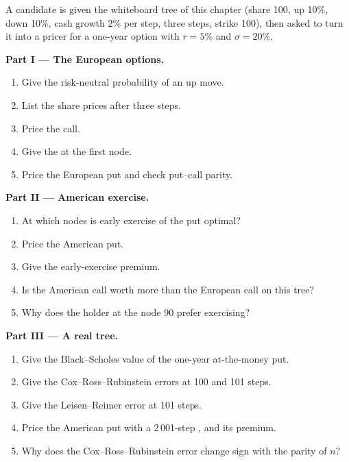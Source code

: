 \begin{problem}\label{pb:dv:the-binomial-model:1}
A candidate is given the whiteboard tree of this chapter (share 100, up 10\%,
down 10\%, cash growth 2\% per step, three steps, strike 100), then asked to turn
it into a pricer for a one-year option with $r=5\%$ and $\sigma=20\%$.

\medskip\noindent\textbf{Part I --- The European options.}
\begin{enumerate}
\item Give the risk-neutral probability of an up move.
\item List the share prices after three steps.
\item Price the call.
\item Give the  at the first node.
\item Price the European put and check put--call parity.
\end{enumerate}

\medskip\noindent\textbf{Part II --- American exercise.}
\begin{enumerate}[resume]
\item At which nodes is early exercise of the put optimal?
\item Price the American put.
\item Give the early-exercise premium.
\item Is the American call worth more than the European call on this tree?
\item Why does the holder at the node 90 prefer exercising?
\end{enumerate}

\medskip\noindent\textbf{Part III --- A real tree.}
\begin{enumerate}[resume]
\item Give the Black--Scholes value of the one-year at-the-money put.
\item Give the Cox--Ross--Rubinstein errors at 100 and 101 steps.
\item Give the Leisen--Reimer error at 101 steps.
\item Price the American put with a 2\,001-step , and its premium.
\item Why does the Cox--Ross--Rubinstein error change sign with the parity of $n$?
\end{enumerate}


\end{problem}
